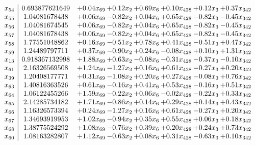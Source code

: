 \documentclass[8pt]{article}
\begin{document}
\[\begin{array}{c| c c@{\hskip 2pt} c@{\hskip 2pt} c@{\hskip 2pt} c@{\hskip 2pt} c@{\hskip 2pt} c@{\hskip 2pt} }
 x_{54}   &  0.693877621649 & +  0.04 x_{69} & +  0.12 x_{2} & +  0.69 x_{6} & +  0.10 x_{428} & +  0.12 x_{3} & +  0.37 x_{342}\\
 x_{55}   &  1.04081678438 & +  0.06 x_{69} & -0.82 x_{2} & +  0.04 x_{6} & +  0.65 x_{428} & -0.82 x_{3} & -0.45 x_{342}\\
 x_{56}   &  1.04081674545 & +  0.06 x_{69} & -0.82 x_{2} & +  0.04 x_{6} & +  0.65 x_{428} & -0.82 x_{3} & -0.45 x_{342}\\
 x_{57}   &  1.04081678438 & +  0.06 x_{69} & -0.82 x_{2} & +  0.04 x_{6} & +  0.65 x_{428} & -0.82 x_{3} & -0.45 x_{342}\\
 x_{58}   &  1.77551048862 & +  0.16 x_{69} & -0.51 x_{2} & +  0.78 x_{6} & +  0.41 x_{428} & -0.51 x_{3} & +  0.47 x_{342}\\
 x_{59}   &  1.24489797711 & +  0.37 x_{69} & -0.90 x_{2} & +  0.24 x_{6} & -0.08 x_{428} & +  0.10 x_{3} & +  1.31 x_{342}\\
 x_{13}   &  0.918367132998 & +  1.88 x_{69} & +  0.63 x_{2} & -0.08 x_{6} & -0.31 x_{428} & -0.37 x_{3} & -0.10 x_{342}\\
 x_{61}   &  2.16326569508 & +  1.24 x_{69} & -1.27 x_{2} & +  0.16 x_{6} & +  0.61 x_{428} & -0.27 x_{3} & +  0.20 x_{342}\\
 x_{39}   &  1.20408177771 & +  0.31 x_{69} & -1.08 x_{2} & +  0.20 x_{6} & +  0.27 x_{428} & -0.08 x_{3} & +  0.76 x_{342}\\
 x_{63}   &  1.40816363526 & +  0.61 x_{69} & -0.16 x_{2} & +  0.41 x_{6} & +  0.53 x_{428} & -0.16 x_{3} & +  0.51 x_{342}\\
 x_{64}   &  1.06122455266 & +  1.59 x_{69} & -0.22 x_{2} & +  0.06 x_{6} & -0.02 x_{428} & -0.22 x_{3} & +  0.33 x_{342}\\
 x_{65}   &  2.14285734182 & +  1.71 x_{69} & -0.86 x_{2} & +  0.14 x_{6} & +  0.29 x_{428} & +  0.14 x_{3} & +  0.43 x_{342}\\
 x_{66}   &  1.16326573394 & +  0.24 x_{69} & -1.27 x_{2} & +  0.16 x_{6} & +  0.61 x_{428} & -0.27 x_{3} & +  0.20 x_{342}\\
 x_{67}   &  1.34693919953 & +  1.02 x_{69} & -0.94 x_{2} & +  0.35 x_{6} & +  0.55 x_{428} & +  0.06 x_{3} & +  0.18 x_{342}\\
 x_{68}   &  1.38775524292 & +  1.08 x_{69} & -0.76 x_{2} & +  0.39 x_{6} & +  0.20 x_{428} & +  0.24 x_{3} & +  0.73 x_{342}\\
 x_{60}   &  1.08163282807 & +  1.12 x_{69} & -0.63 x_{2} & +  0.08 x_{6} & +  0.31 x_{428} & -0.63 x_{3} & +  0.10 x_{342}\\

\end{array}\]
\end{document}
